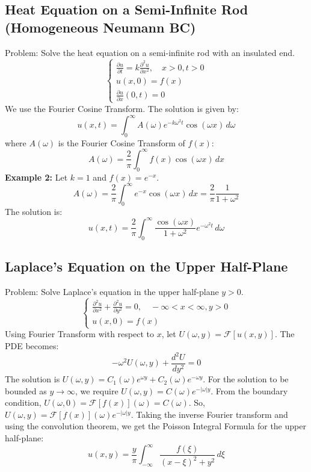 \documentclass{article}
\begin{document}
	\subsection{Heat Equation on a Semi-Infinite Rod (Homogeneous Neumann BC)}
	Problem: Solve the heat equation on a semi-infinite rod with an insulated end.
	$$
	\begin{cases}
		\frac{\partial u}{\partial t} = k \frac{\partial^2 u}{\partial x^2}, \quad x > 0, t > 0 \\
		u(x,0) = f(x) \\
		\frac{\partial u}{\partial x}(0,t) = 0
	\end{cases}
	$$
	We use the Fourier Cosine Transform. The solution is given by:
	$$
	u(x,t) = \int_0^\infty A(\omega) e^{-k\omega^2 t} \cos(\omega x) \,d\omega
	$$
	where $A(\omega)$ is the Fourier Cosine Transform of $f(x)$:
	$$
	A(\omega) = \frac{2}{\pi} \int_0^\infty f(x) \cos(\omega x) \,dx
	$$
	\textbf{Example 2:} Let $k=1$ and $f(x) = e^{-x}$.
	$$
	A(\omega) = \frac{2}{\pi} \int_0^\infty e^{-x} \cos(\omega x) \,dx = \frac{2}{\pi} \frac{1}{1+\omega^2}
	$$
	The solution is:
	$$
	u(x,t) = \frac{2}{\pi} \int_0^\infty \frac{\cos(\omega x)}{1+\omega^2} e^{-\omega^2 t} \,d\omega
	$$
	
	\subsection{Laplace's Equation on the Upper Half-Plane}
	Problem: Solve Laplace's equation in the upper half-plane $y>0$.
	$$
	\begin{cases}
		\frac{\partial^2 u}{\partial x^2} + \frac{\partial^2 u}{\partial y^2} = 0, \quad -\infty < x < \infty, y>0 \\
		u(x,0) = f(x)
	\end{cases}
	$$
	Using Fourier Transform with respect to $x$, let $U(\omega, y) = \mathcal{F}[u(x,y)]$. The PDE becomes:
	$$
	-\omega^2 U(\omega, y) + \frac{d^2 U}{dy^2} = 0
	$$
	The solution is $U(\omega, y) = C_1(\omega)e^{\omega y} + C_2(\omega)e^{-\omega y}$. For the solution to be bounded as $y \to \infty$, we require $U(\omega, y) = C(\omega)e^{-|\omega|y}$.
	From the boundary condition, $U(\omega, 0) = \mathcal{F}[f(x)](\omega) = C(\omega)$.
	So, $U(\omega, y) = \mathcal{F}[f(x)](\omega)e^{-|\omega|y}$.
	Taking the inverse Fourier transform and using the convolution theorem, we get the Poisson Integral Formula for the upper half-plane:
	$$
	u(x,y) = \frac{y}{\pi} \int_{-\infty}^\infty \frac{f(\xi)}{(x-\xi)^2 + y^2} \,d\xi
	$$
	
\end{document}

